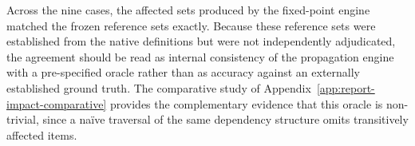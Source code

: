 \documentclass[10pt]{article}
\begin{document}
Across the nine cases, the affected sets produced by the fixed-point
engine matched the frozen reference sets exactly. Because these reference sets were established from the native definitions but were not
independently adjudicated, the agreement should be read as internal
consistency of the propagation engine with a pre-specified oracle rather
than as accuracy against an externally established ground truth. The
comparative study of Appendix~\ref{app:report-impact-comparative}
provides the complementary evidence that this oracle is non-trivial,
since a na\"ive traversal of the same dependency structure omits
transitively affected items.




\end{document}
